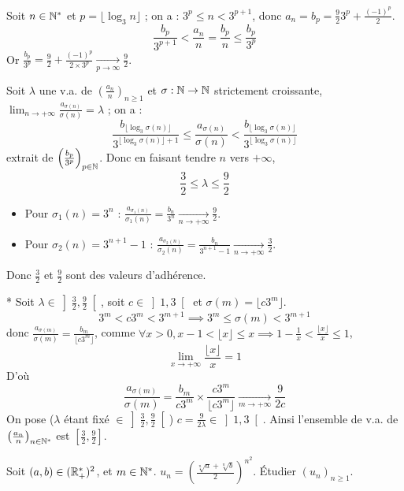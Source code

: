 \begin{solution}
Soit $n \in \mathbb N^*$ et $p = \lfloor \log_3 n \rfloor$ ; on a : $3^p \leq n < 3^{p+1}$,
donc $a_n = b_p = \frac{9}{2} 3^p + \frac{(-1)^p}{2}$.
\[
\frac{b_p}{3^{p+1}} < \frac{a_n}{n} = \frac{b_p}{n} \leq \frac{b_p}{3^p}
\]
Or $\frac{b_p}{3^p} = \frac{9}{2} + \frac{(-1)^p}{2 \times 3^p} \xrightarrow[p \to \infty]{} \frac{9}{2}$.

Soit $\lambda$ une v.a. de $\left( \frac{a_n}{n} \right)_{n \geq 1}$ et $\sigma : \mathbb N \to \mathbb N$ strictement croissante, $\lim_{n \to +\infty} \frac{a_{\sigma(n)}}{\sigma(n)} = \lambda$ ; on a :
\[
\frac{b_{\lfloor \log_3 \sigma(n) \rfloor}}{3^{\lfloor \log_3 \sigma(n) \rfloor + 1}} \leq \frac{a_{\sigma(n)}}{\sigma(n)} < \frac{b_{\lfloor \log_3 \sigma(n) \rfloor}}{3^{\lfloor \log_3 \sigma(n) \rfloor}}
\]
extrait de $\left( \frac{b_p}{3^p} \right)_{p \in \mathbb N}$.
Donc en faisant tendre $n$ vers $+\infty$,
\[
\frac{3}{2} \leq \lambda \leq \frac{9}{2}
\]
\begin{itemize}
  \item Pour $\sigma_1(n) = 3^n$ : $\frac{a_{\sigma_1(n)}}{\sigma_1(n)} = \frac{b_n}{3^n} \xrightarrow[n \to +\infty]{} \frac{9}{2}$.
  \item Pour $\sigma_2(n) = 3^{n+1} - 1$ : $\frac{a_{\sigma_2(n)}}{\sigma_2(n)} = \frac{b_n}{3^{n+1} - 1} \xrightarrow[n \to +\infty]{} \frac{3}{2}$.
\end{itemize}
Donc $\frac{3}{2}$ et $\frac{9}{2}$ sont des valeurs d'adhérence.

* Soit $\lambda \in \left] \frac{3}{2}, \frac{9}{2} \right[$, soit $c \in \left] 1, 3 \right[$ et $\sigma(m) = \lfloor c 3^m \rfloor$.
\[
3^m < c 3^m < 3^{m+1} \implies 3^m \leq \sigma(m) < 3^{m+1}
\]
donc $\frac{a_{\sigma(m)}}{\sigma(m)} = \frac{b_m}{\lfloor c 3^m \rfloor}$, comme $\forall x > 0, x - 1 < \lfloor x \rfloor \leq x \implies 1 - \frac{1}{x} < \frac{\lfloor x \rfloor}{x} \leq 1$,
\[
\lim_{x \to +\infty} \frac{\lfloor x \rfloor}{x} = 1
\]
D'où
\[
\frac{a_{\sigma(m)}}{\sigma(m)} = \frac{b_m}{c 3^m} \times \frac{c 3^m}{\lfloor c 3^m \rfloor} \xrightarrow[m \to +\infty]{} \frac{9}{2c}
\]
On pose ($\lambda$ étant fixé $\in \left] \frac{3}{2}, \frac{9}{2} \right[$) $c = \frac{9}{2\lambda} \in \left] 1, 3 \right[$.
Ainsi l'ensemble de v.a. de $\left( \frac{a_n}{n} \right)_{n \in \mathbb N^*}$ est $\left[ \frac{3}{2}, \frac{9}{2} \right]$.
\end{solution}


\begin{statementbox}
Soit $(a,b) \in (\mathbb R_+^*)^2$, et $m \in \mathbb N^*$. $u_n = \left( \frac{\sqrt[n]{a} + \sqrt[n]{b}}{2} \right)^{n^2}$.
Étudier $(u_n)_{n \geq 1}$.
\end{statementbox}

